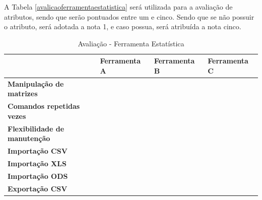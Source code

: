 A Tabela \ref{avalicaoferramentaestatistica} será utilizada para a avaliação de atributos, sendo que serão
pontuados entre um e cinco. Sendo que se não possuir o atributo, será adotada a nota 1, e caso possua, será
atribuída a nota cinco.
\begin{table}[]
    \centering
    \caption{Avaliação - Ferramenta Estatística}
    \label{my-label}
    \begin{tabular}{@{}llll@{}}
        \toprule
        \multicolumn{1}{|l|}{}                                       & \multicolumn{1}{l|}{\textbf{Ferramenta A}} & \multicolumn{1}{l|}{\textbf{Ferramenta B}} & \multicolumn{1}{l|}{\textbf{Ferramenta C}} \\ \midrule
        \multicolumn{1}{|l|}{\textbf{Manipulação de matrizes}}       & \multicolumn{1}{l|}{}                      & \multicolumn{1}{l|}{}                      & \multicolumn{1}{l|}{}                      \\ \midrule
        \multicolumn{1}{|l|}{\textbf{Comandos repetidas vezes}}      & \multicolumn{1}{l|}{}                      & \multicolumn{1}{l|}{}                      & \multicolumn{1}{l|}{}                      \\ \midrule
        \multicolumn{1}{|l|}{\textbf{Flexibilidade de manutenção}}   & \multicolumn{1}{l|}{}                      & \multicolumn{1}{l|}{}                      & \multicolumn{1}{l|}{}                      \\ \midrule
        \multicolumn{1}{|l|}{\textbf{Importação CSV}}                & \multicolumn{1}{l|}{}                      & \multicolumn{1}{l|}{}                      & \multicolumn{1}{l|}{}                      \\ \midrule
        \multicolumn{1}{|l|}{\textbf{Importação XLS}}                & \multicolumn{1}{l|}{}                      & \multicolumn{1}{l|}{}                      & \multicolumn{1}{l|}{}                      \\ \midrule
        \multicolumn{1}{|l|}{\textbf{Importação ODS}}                & \multicolumn{1}{l|}{}                      & \multicolumn{1}{l|}{}                      & \multicolumn{1}{l|}{}                      \\ \midrule
        \multicolumn{1}{|l|}{\textbf{Exportação CSV}}                & \multicolumn{1}{l|}{}                      & \multicolumn{1}{l|}{}                      & \multicolumn{1}{l|}{}                      \\ \midrule

\end{tabular}
\end{table}

